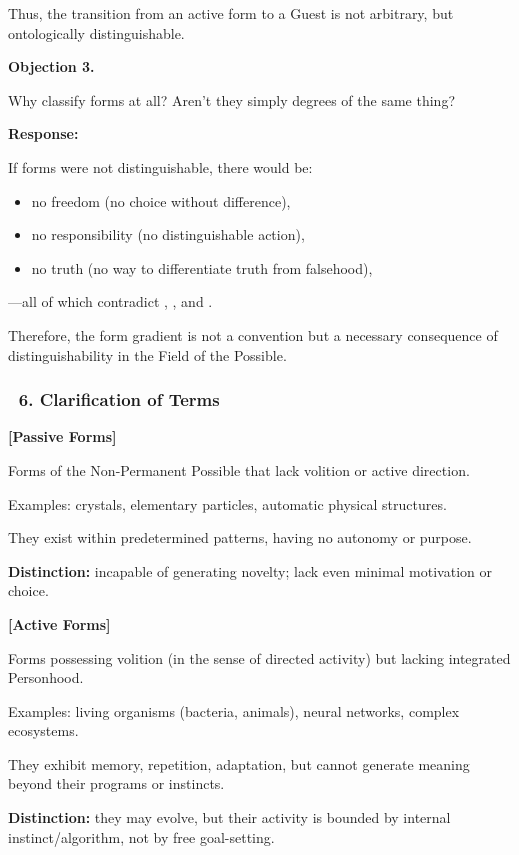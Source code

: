\documentclass[12pt]{article}
\begin{document}
Thus, the transition from an active form to a Guest is not arbitrary, but ontologically distinguishable.

\textbf{Objection 3.}

Why classify forms at all? Aren’t they simply degrees of the same thing?

\textbf{Response:}

If forms were not distinguishable, there would be:

\begin{itemize}
\item no freedom (no choice without difference),
\item no responsibility (no distinguishable action),
\item no truth (no way to differentiate truth from falsehood),
\end{itemize}

—all of which contradict \text{[9]}, \text{[11.2]}, and \text{[11.3]}.

Therefore, the form gradient is not a convention but a necessary consequence of distinguishability in the Field of the Possible.

\subsubsection*{🔹 6. Clarification of Terms}

\textbf{[Passive Forms]}

Forms of the Non-Permanent Possible that lack volition or active direction.

Examples: crystals, elementary particles, automatic physical structures.

They exist within predetermined patterns, having no autonomy or purpose.

\textbf{Distinction:} incapable of generating novelty; lack even minimal motivation or choice.

\textbf{[Active Forms]}

Forms possessing volition (in the sense of directed activity) but lacking integrated Personhood.

Examples: living organisms (bacteria, animals), neural networks, complex ecosystems.

They exhibit memory, repetition, adaptation, but cannot generate meaning beyond their programs or instincts.

\textbf{Distinction:} they may evolve, but their activity is bounded by internal instinct/algorithm, not by free goal-setting.
\end{document}
